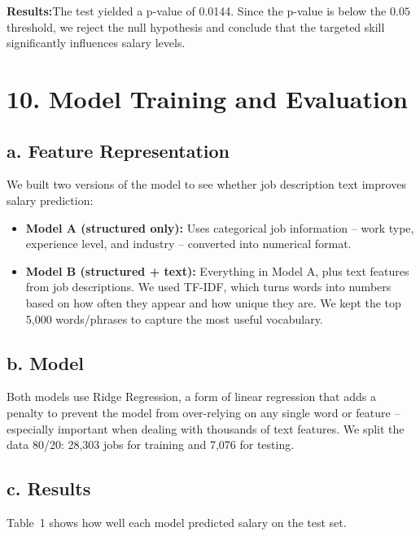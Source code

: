 \documentclass[11pt]{article}
\begin{document}
\textbf{Results:}The test yielded a p-value of 0.0144. Since the p-value is below the $0.05$ threshold, we reject the null hypothesis and conclude that the targeted skill significantly influences salary levels.



\section*{10. Model Training and Evaluation}

\subsection*{a. Feature Representation}

We built two versions of the model to see whether job description text improves salary prediction:

\begin{itemize}
    \item \textbf{Model A (structured only):} Uses categorical job information -- work type, experience level, and industry -- converted into numerical format.
    \item \textbf{Model B (structured + text):} Everything in Model A, plus text features from job descriptions. We used TF-IDF, which turns words into numbers based on how often they appear and how unique they are. We kept the top 5{,}000 words/phrases to capture the most useful vocabulary.
\end{itemize}

\subsection*{b. Model}

Both models use Ridge Regression, a form of linear regression that adds a penalty to prevent the model from over-relying on any single word or feature -- especially important when dealing with thousands of text features. We split the data 80/20: 28{,}303 jobs for training and 7{,}076 for testing.

\subsection*{c. Results}

Table~1 shows how well each model predicted salary on the test set.
\end{document}

